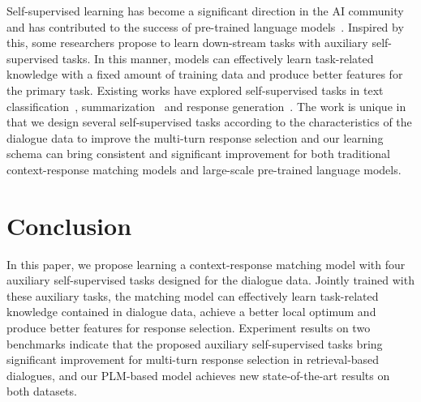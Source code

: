\documentclass{article}
\begin{document}
Self-supervised learning has become a significant direction in the AI community and has contributed to the success of pre-trained language models~\cite{devlin-etal-2019-bert,yang2019xlnet,liu2019roberta}.
Inspired by this, some researchers propose to learn down-stream tasks with auxiliary self-supervised tasks.
In this manner, models can effectively learn task-related knowledge with a fixed amount of training data and produce better features for the primary task.
Existing works have explored self-supervised tasks in text classification~\cite{yu-jiang-2016-learning}, summarization~\cite{wang-etal-2019-self} and response generation~\cite{zhang2019consistent,zhao2020learning}.
The work is unique in that we design several self-supervised tasks according to the characteristics of the dialogue data to improve the multi-turn response selection and our learning schema can bring consistent and significant improvement for both traditional context-response matching models and large-scale pre-trained language models.
 

\section{Conclusion}
In this paper, we propose learning a context-response matching model with four auxiliary self-supervised tasks designed for the dialogue data.
Jointly trained with these auxiliary tasks, the matching model can effectively learn task-related knowledge contained in dialogue data, achieve a better local optimum and produce better features for response selection.
Experiment results on two benchmarks indicate that the proposed auxiliary self-supervised tasks bring significant improvement for multi-turn response selection in retrieval-based dialogues, and our PLM-based model achieves new state-of-the-art results on both datasets.


\nocite{langley00}


\end{document}

